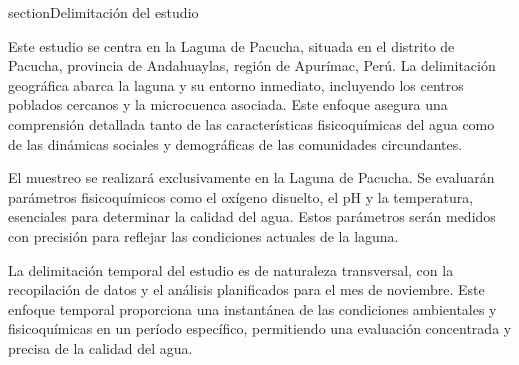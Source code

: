 \begin{comment}
    
\subsection{Cambio Climático y Distribución del Agua}
Se prevé que el cambio climático altere la distribución mundial del agua, con importantes variaciones en las predicciones del Grupo Intergubernamental de Expertos sobre el Cambio Climático (IPCC) incluso dentro de una misma región\cite{dwAguaEscasa}. En el contexto de la Laguna de Pacucha, esto podría significar cambios en los patrones de lluvia y evaporación, afectando directamente los parámetros fisicoquímicos que son cruciales en mi estudio para la evaluación de la calidad del agua.

\subsection{Necesidad de Acción Inmediata}
Dada la variabilidad de las proyecciones sobre el cambio climático y sus efectos directos sobre el ciclo hidrológico, es necesario actuar de inmediato\cite{dwAguaEscasa}. Mi tesis contribuye a esta acción al proporcionar un entendimiento  de la calidad actual del agua en la Laguna de Pacucha, ofreciendo una base para estrategias de adaptación y mitigación efectivas en la región una vez estimadas los parametros en estudio.
\end{comment}


section{Delimitación del estudio}

Este estudio se centra en la Laguna de Pacucha, situada en el distrito de Pacucha, provincia de Andahuaylas, región de Apurímac, Perú. La delimitación geográfica abarca la laguna y su entorno inmediato, incluyendo los centros poblados cercanos y la microcuenca asociada. Este enfoque asegura una comprensión detallada tanto de las características fisicoquímicas del agua como de las dinámicas sociales y demográficas de las comunidades circundantes.

El muestreo se realizará exclusivamente en la Laguna de Pacucha. Se evaluarán parámetros fisicoquímicos como el oxígeno disuelto, el pH y la temperatura, esenciales para determinar la calidad del agua. Estos parámetros serán medidos con precisión para reflejar las condiciones actuales de la laguna.

La delimitación temporal del estudio es de naturaleza transversal, con la recopilación de datos y el análisis planificados para el mes de noviembre. Este enfoque temporal proporciona una instantánea de las condiciones ambientales y fisicoquímicas en un período específico, permitiendo una evaluación concentrada y precisa de la calidad del agua.





